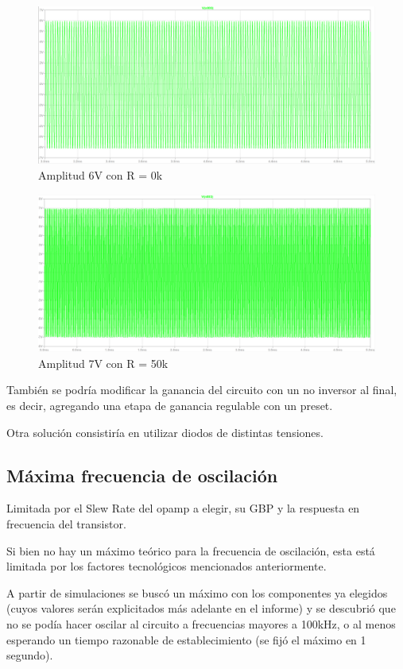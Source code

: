 \documentclass[../../tc_tp6_main.tex]{subfiles}
\begin{document}
\begin{figure}[H]	
	\centering
	\includegraphics[scale=0.5]{imagenes/variacion_amplitud1.png}
	\caption{Amplitud 6V con R = 0k\ohm}
	\label{fig:ej1_variacion_amplitud}
\end{figure}
\begin{figure}[H]	
	\centering
	\includegraphics[scale=0.5]{imagenes/variacion_amplitud2.png}
	\caption{Amplitud 7V con R = 50k\ohm}
	\label{fig:ej1_variacion_amplitud}
\end{figure}
También se podría modificar la ganancia del circuito con un no inversor al final, es decir, agregando una etapa de ganancia regulable con un preset.\par
Otra solución consistiría en utilizar diodos de distintas tensiones.

\subsection{Máxima frecuencia de oscilación}

Limitada por el Slew Rate del opamp a elegir, su GBP y la respuesta en frecuencia del transistor.\par
Si bien no hay un máximo teórico para la frecuencia de oscilación, esta está limitada por los factores tecnológicos mencionados anteriormente.\par
A partir de simulaciones se buscó un máximo con los componentes ya elegidos (cuyos valores serán explicitados más adelante en el informe) y se descubrió que no se podía hacer oscilar al circuito a frecuencias mayores a 100kHz, o al menos esperando un tiempo razonable de establecimiento (se fijó el máximo en 1 segundo).
\end{document}
